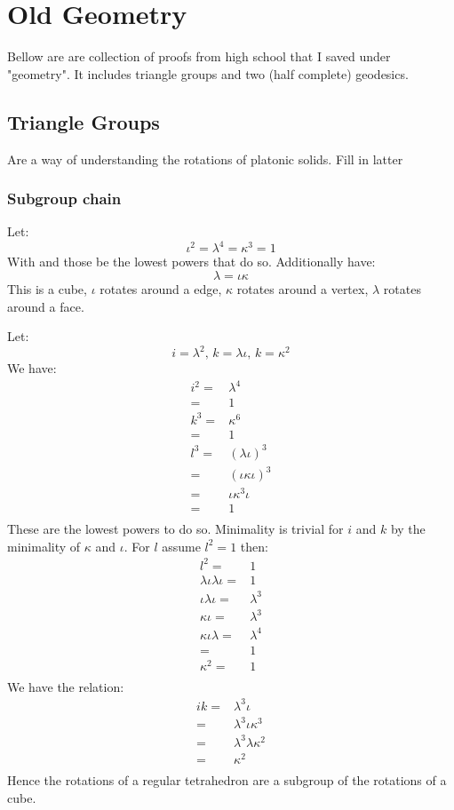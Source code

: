\section{Old Geometry}
Bellow are are collection of proofs from high school that I saved under "geometry".
It includes triangle groups and two (half complete) geodesics.
\subsection{Triangle Groups}
Are a way of understanding the rotations of platonic solids.
Fill in latter
\subsubsection{Subgroup chain}
Let:
\[\iota^2 = \lambda^4 = \kappa^3 = 1\]
With and those be the lowest powers that do so.
Additionally have:
\[\lambda = \iota\kappa\]
This is a cube, $\iota$ rotates around a edge, $\kappa$ rotates around a vertex, $\lambda$ rotates around a face.

Let:
\[i = \lambda^2,\,k=\lambda\iota,\,k=\kappa^2\]
We have:
\begin{equation*}
\begin{aligned}
i^2 =& \lambda^4\\
	=& 1 \\
k^3 =& \kappa^6\\
	=&1\\
l^3 =& (\lambda\iota)^3\\
	=&(\iota\kappa\iota)^3\\
	=&\iota\kappa^3\iota\\
	=&1\\
\end{aligned}
\end{equation*}
These are the lowest powers to do so.
Minimality is trivial for $i$ and $k$ by the minimality of $\kappa$ and $\iota$.
For $l$ assume $l^2 = 1$ then:
\begin{equation*}
\begin{aligned}
l^2 =& 1\\
\lambda\iota\lambda\iota =& 1\\
\iota\lambda\iota =& \lambda^3\\
\kappa\iota =& \lambda^3\\
\kappa\iota\lambda =& \lambda^4\\
=&1\\
\kappa^2 =& 1\\
\end{aligned}
\end{equation*}
We have the relation:
\begin{equation*}
\begin{aligned}
ik =& \lambda^3\iota\\
	=&\lambda^3\iota\kappa^3\\
	=&\lambda^3\lambda\kappa^2\\
	=&\kappa^2\\
\end{aligned}
\end{equation*}
Hence the rotations of a regular tetrahedron are a subgroup of the rotations of a cube.
